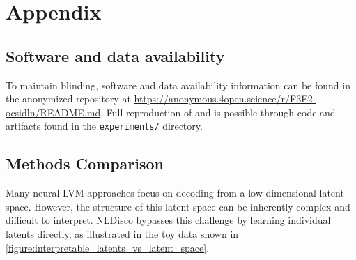 \section{Appendix}

\renewcommand{\thefigure}{S\arabic{figure}}
\setcounter{figure}{0}
\renewcommand{\thetable}{S\arabic{table}}
\renewcommand{\theHtable}{S\arabic{table}}
\setcounter{table}{0}

\subsection{Software and data availability}
\label{subsection:software_data_availability}

To maintain blinding, software and data availability information can be found in the anonymized repository at \url{https://anonymous.4open.science/r/F3E2-ocsidln/README.md}. Full reproduction of  and  is possible through code and artifacts found in the \texttt{experiments/} directory.


    


\subsection{Methods Comparison}

Many neural LVM approaches focus on decoding from a low-dimensional latent space. However, the structure of this latent space can be inherently complex and difficult to interpret. NLDisco bypasses this challenge by learning individual latents directly, as illustrated in the toy data shown in \autoref{figure:interpretable_latents_vs_latent_space}.

